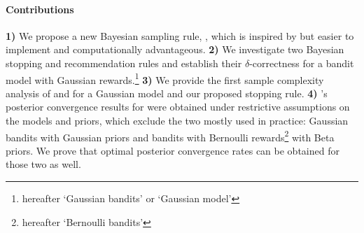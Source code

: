 % 


\paragraph{Contributions} %
\textbf{1)}
We propose a new Bayesian sampling rule, \TCC, which is inspired by \TTTS but easier to implement and computationally advantageous. 
\textbf{2)} We investigate two Bayesian stopping and recommendation rules and establish their $\delta$-correctness for a bandit model with Gaussian rewards.\footnote{hereafter `Gaussian bandits' or `Gaussian model'}
\textbf{3)}
We provide the first sample complexity analysis of \TTTS and \TCC for a Gaussian model and our proposed stopping rule.
\textbf{4)} \citeauthor{russo2016ttts}'s posterior convergence results for \TTTS were obtained under restrictive assumptions on the models and priors, which exclude the two mostly used in practice: Gaussian bandits with Gaussian priors and bandits with Bernoulli rewards\footnote{hereafter `Bernoulli bandits'} with Beta priors. We prove that optimal posterior convergence rates can be obtained for those two as well.
